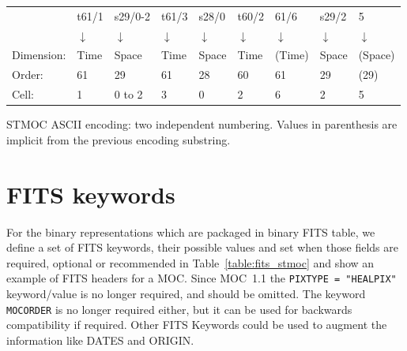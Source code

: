 \documentclass[11pt,a4paper]{ivoa}
\begin{document}
\begin{center}
{\small
  \begin{tabular} { l l l l l l l l l }
   & t61/1      & s29/0-2    & t61/3      & s28/0 & t60/2 & 61/6 & s29/2 & 5\\
   & $\downarrow$ & $\downarrow$ & $\downarrow$ & $\downarrow$ & $\downarrow$ & $\downarrow$ & $\downarrow$ & $\downarrow$ \\
Dimension: & Time & Space  & Time  & Space & Time  & (Time) & Space & (Space) \\
Order:     & 61   & 29     & 61    & 28    & 60    & 61     &  29   & (29)\\
Cell:      & 1    & 0 to 2 & 3     & 0     & 2     & 6      &  2    & 5 \\
\end{tabular}}
STMOC ASCII encoding: two independent numbering. Values in parenthesis are implicit from the previous encoding substring.
\end{center}


\section{FITS keywords}
\label{sec:fits-key-moc}
For the binary representations which are packaged in binary FITS table,
we define a set of FITS keywords, their possible values and set when
those fields are required, optional or recommended in
Table~\ref{table:fits_stmoc} and show an example of FITS headers for a MOC.
Since MOC~1.1 \citep{2019ivoa.spec.1007F} the {\tt PIXTYPE = "HEALPIX"}
keyword/value is no longer required, and should be omitted.
The keyword {\tt MOCORDER} is no longer required either, but it can be used for
backwards compatibility if required.
Other FITS Keywords could be used to augment the information like DATES and ORIGIN.



 
\clearpage 
\end{document}
